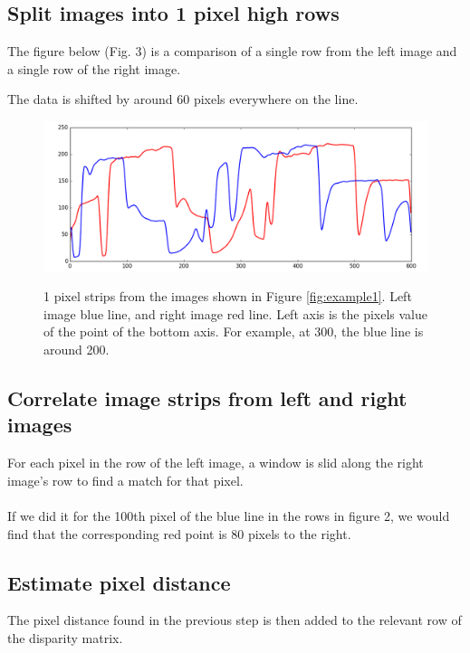 \documentclass[11pt,fleqn]{article}
\begin{document}

\subsection{Split images into 1 pixel high rows}

The figure below (Fig. 3) is a comparison of a single row from the left image and a single row of the right image. 


The data is shifted by around 60 pixels everywhere on the line.
\\

\begin{figure}[!ht]
\label{fig:strips}
\centering
\includegraphics[width=1\textwidth]{images/strips.png} \\[2pt]
\caption{1 pixel strips from the images shown in Figure \ref{fig:example1}. Left image blue line, and right image red line. Left axis is the pixels value of the point of the bottom axis. For example, at 300, the blue line is around 200.}
\end{figure}

\subsection{Correlate image strips from left and right images}
For each pixel in the row of the left image, a window is slid along the right image's row to find a match for that pixel.\\
\\
If we did it for the 100th pixel of the blue line in the rows in figure 2, we would find that the corresponding red point is 80 pixels to the right.

\subsection{Estimate pixel distance}
The pixel distance found in the previous step is then added to the relevant row of the disparity matrix.
\end{document}

